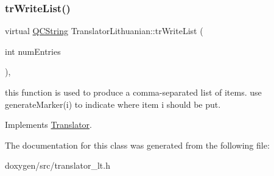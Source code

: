\subsubsection{\texorpdfstring{trWriteList()}{trWriteList()}}
{\footnotesize\ttfamily virtual \mbox{\hyperlink{class_q_c_string}{Q\+C\+String}} Translator\+Lithuanian\+::tr\+Write\+List (\begin{DoxyParamCaption}\item[{int}]{num\+Entries }\end{DoxyParamCaption})\hspace{0.3cm}{\ttfamily [inline]}, {\ttfamily [virtual]}}

this function is used to produce a comma-\/separated list of items. use generate\+Marker(i) to indicate where item i should be put. 

Implements \mbox{\hyperlink{class_translator}{Translator}}.



The documentation for this class was generated from the following file\+:\begin{DoxyCompactItemize}
\item 
doxygen/src/translator\+\_\+lt.\+h\end{DoxyCompactItemize}
